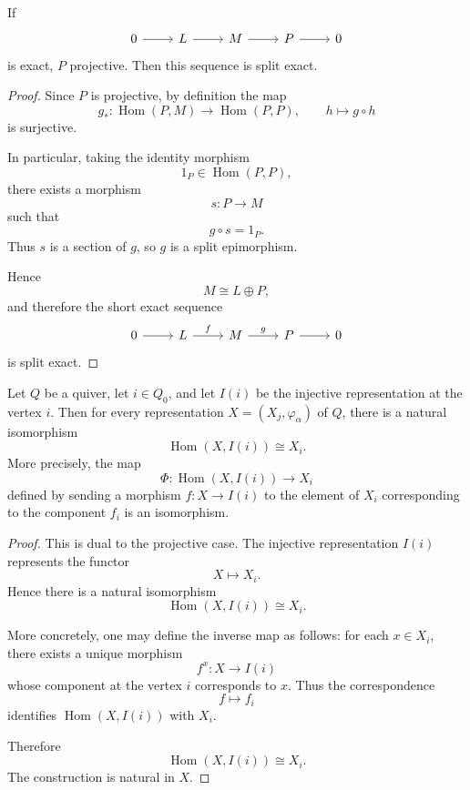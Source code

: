 \documentclass[11pt, a4paper]{report}
\begin{document}
\begin{corollary}
    If
    \[
        \begin{tikzcd}
            0 \arrow[r] & L \arrow[r] & M \arrow[r] & P \arrow[r] & 0
        \end{tikzcd}
    \]
    is exact, $P$ projective. Then this sequence is split exact.
\end{corollary}

\begin{proof}
    Since $P$ is projective, by definition the map
    \[
        g_*:\operatorname{Hom}(P,M)\longrightarrow \operatorname{Hom}(P,P),
        \qquad h\longmapsto g\circ h
    \]
    is surjective.

    In particular, taking the identity morphism
    \[
        1_P\in \operatorname{Hom}(P,P),
    \]
    there exists a morphism
    \[
        s:P\to M
    \]
    such that
    \[
        g\circ s=1_P.
    \]
    Thus $s$ is a section of $g$, so $g$ is a split epimorphism.

    Hence
    \[
        M\cong L\oplus P,
    \]
    and therefore the short exact sequence
    \[
        \begin{tikzcd}
            0 \arrow[r] & L \arrow[r, "f"] & M \arrow[r, "g"] & P \arrow[r] & 0
        \end{tikzcd}
    \]
    is split exact.
\end{proof}

\begin{lemma}\label{lem:Hom-X-Ii}
    Let $Q$ be a quiver, let $i\in Q_0$, and let $I(i)$ be the injective representation at the vertex $i$. Then for every representation $X=(X_j,\varphi_\alpha)$ of $Q$, there is a natural isomorphism
    \[
        \operatorname{Hom}(X,I(i))\cong X_i.
    \]
    More precisely, the map
    \[
        \Phi:\operatorname{Hom}(X,I(i))\longrightarrow X_i
    \]
    defined by sending a morphism $f:X\to I(i)$ to the element of $X_i$ corresponding to the component $f_i$ is an isomorphism.
\end{lemma}

\begin{proof}
    This is dual to the projective case. The injective representation $I(i)$ represents the functor
    \[
        X\longmapsto X_i.
    \]
    Hence there is a natural isomorphism
    \[
        \operatorname{Hom}(X,I(i))\cong X_i.
    \]

    More concretely, one may define the inverse map as follows: for each $x\in X_i$, there exists a unique morphism
    \[
        f^x:X\to I(i)
    \]
    whose component at the vertex $i$ corresponds to $x$. Thus the correspondence
    \[
        f\longmapsto f_i
    \]
    identifies $\operatorname{Hom}(X,I(i))$ with $X_i$.

    Therefore
    \[
        \operatorname{Hom}(X,I(i))\cong X_i.
    \]
    The construction is natural in $X$.
\end{proof}
\end{document}

